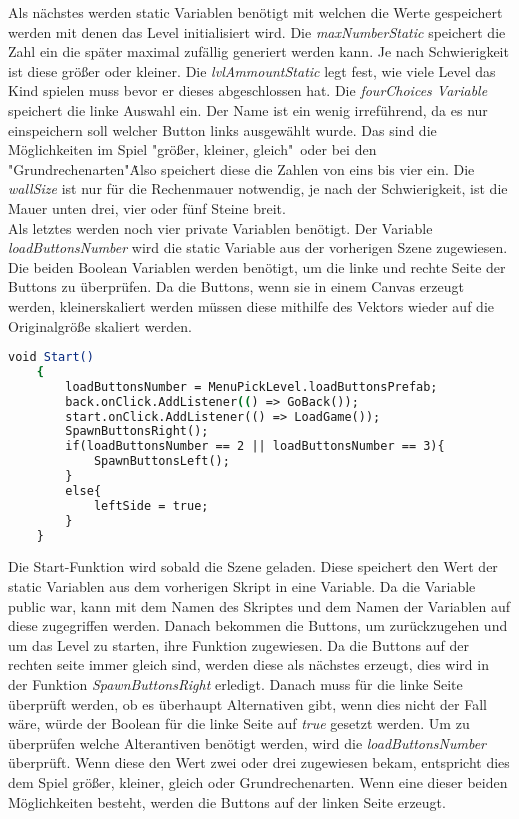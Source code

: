 Als nächstes werden static Variablen benötigt mit welchen die Werte gespeichert werden mit denen das Level initialisiert wird. Die \textit{maxNumberStatic} speichert die Zahl ein die später maximal zufällig generiert werden kann. Je nach Schwierigkeit ist diese größer oder kleiner. Die \textit{lvlAmmountStatic} legt fest, wie viele Level das Kind spielen muss bevor er dieses abgeschlossen hat. Die \textit{fourChoices Variable} speichert die linke Auswahl ein. Der Name ist ein wenig irreführend, da es nur einspeichern soll welcher Button links ausgewählt wurde. Das sind die Möglichkeiten im Spiel "größer, kleiner, gleich"\ oder bei den "Grundrechenarten"\. Also speichert diese die Zahlen von eins bis vier ein. Die \textit{wallSize} ist nur für die Rechenmauer notwendig, je nach der Schwierigkeit, ist die Mauer unten drei, vier oder fünf Steine breit.\\
Als letztes werden noch vier private Variablen benötigt. Der Variable \textit{loadButtonsNumber} wird die static Variable aus der vorherigen Szene zugewiesen. Die beiden Boolean Variablen werden benötigt, um die linke und rechte Seite der Buttons zu überprüfen. Da die Buttons, wenn sie in einem Canvas erzeugt werden, kleinerskaliert werden müssen diese mithilfe des Vektors wieder auf die Originalgröße skaliert werden.\\
\begin{lstlisting}[language=csh, caption={MenuPickLevelAdvanced.cs Start-Funktion}]
	void Start()
	{
		loadButtonsNumber = MenuPickLevel.loadButtonsPrefab;
		back.onClick.AddListener(() => GoBack());
		start.onClick.AddListener(() => LoadGame());
		SpawnButtonsRight();
		if(loadButtonsNumber == 2 || loadButtonsNumber == 3){
			SpawnButtonsLeft();
		}
		else{
			leftSide = true;
		}
	}
\end{lstlisting}
Die Start-Funktion wird sobald die Szene geladen. Diese speichert den Wert der static Variablen aus dem vorherigen Skript in eine Variable. Da die Variable public war, kann mit dem Namen des Skriptes und dem Namen der Variablen auf diese zugegriffen werden.
Danach bekommen die Buttons, um zurückzugehen und um das Level zu starten, ihre Funktion zugewiesen. Da die Buttons auf der rechten seite immer gleich sind, werden diese als nächstes erzeugt, dies wird in der Funktion \textit{SpawnButtonsRight} erledigt. Danach muss für die linke Seite überprüft werden, ob es überhaupt Alternativen gibt, wenn dies nicht der Fall wäre, würde der Boolean für die linke Seite auf \textit{true} gesetzt werden. Um zu überprüfen welche Alterantiven benötigt werden, wird die \textit{loadButtonsNumber} überprüft. Wenn diese den Wert zwei oder drei zugewiesen bekam, entspricht dies dem Spiel  größer, kleiner, gleich oder Grundrechenarten. Wenn eine dieser beiden Möglichkeiten besteht, werden die Buttons auf der linken Seite erzeugt.\\
